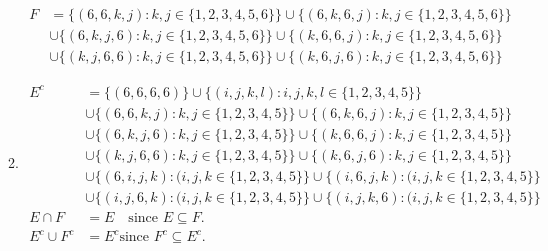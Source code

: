 \documentclass{article}
\begin{document}
\begin{enumerate}
\begin{enumerate}
\begin{align*}
F &= \{(6,6,k,j) : k,j \in \{1,2,3,4,5,6\} \}
\cup \{(6,k,6,j) : k,j \in \{1,2,3,4,5,6\} \} \\
&\cup\{(6,k,j,6) : k,j \in \{1,2,3,4,5,6\} \}
\cup \{(k,6,6,j) : k,j \in \{1,2,3,4,5,6\} \} \\
&\cup \{(k,j,6,6) : k,j \in \{1,2,3,4,5,6\} \}
\cup \{(k,6,j,6) : k,j \in \{1,2,3,4,5,6\} \}
\end{align*}

\item 

\begin{align*}
E^c &= \{(6,6,6,6)\} \cup \{(i,j,k,l) : i,j,k,l \in \{1,2,3,4,5\}\} \\
&\cup\{(6,6,k,j) : k,j \in \{1,2,3,4,5\} \}
\cup \{(6,k,6,j) : k,j \in \{1,2,3,4,5\} \} \\
&\cup\{(6,k,j,6) : k,j \in \{1,2,3,4,5\} \}
\cup \{(k,6,6,j) : k,j \in \{1,2,3,4,5\} \} \\
&\cup \{(k,j,6,6) : k,j \in \{1,2,3,4,5\} \}
\cup \{(k,6,j,6) : k,j \in \{1,2,3,4,5\} \}\\
&\cup\{(6,i,j,k) : (i,j,k \in \{1,2,3,4,5\}\} 
\cup \{(i,6,j,k) : (i,j,k \in \{1,2,3,4,5\}\} \\
&\cup\{(i,j,6,k) : (i,j,k \in \{1,2,3,4,5\}\} 
\cup \{(i,j,k,6) : (i,j,k \in \{1,2,3,4,5\}\} \\
E\cap F &= E \quad \text{since } E \subseteq F.\\
E^c \cup F^c &= E^c \text{since } F^c \subseteq E^c.
\end{align*}




\end{enumerate}

\end{enumerate}
\end{document}
